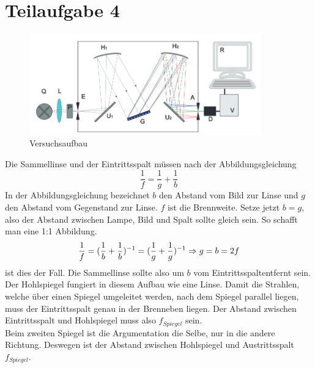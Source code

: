 

\section{Teilaufgabe 4}

\begin{figure}[h]
    \begin{center}
        \includegraphics[width=10cm]{Bilder/SP1.PNG}
    \end{center}
    \caption{Versuchsaufbau}
\end{figure}
Die Sammellinse und der Eintrittsspalt müssen nach der Abbildungsgleichung 
\begin{equation}
    \frac{1}{f}= \frac{1}{g}+\frac{1}{b}   
\end{equation}
In der Abbildungsgleichung bezeichnet $b$ den Abstand vom Bild zur Linse und $g$ den Abstand vom Gegenstand zur Linse. $f$ ist die Brennweite. Setze jetzt $b = g $, also der Abstand zwischen 
Lampe, Bild und Spalt sollte gleich sein. So schafft man eine 1:1 Abbildung. 
\begin{equation}
    \frac{1}{f} = (\frac{1}{b}+\frac{1}{b})^{-1} = (\frac{1}{g}+\frac{1}{g})^{-1}
    \newline
    \Rightarrow g = b = 2f
\end{equation}
ist dies der Fall. Die Sammellinse sollte also um $b$ vom Eintrittsspaltentfernt sein.\\
Der Hohlspiegel fungiert in diesem Aufbau wie eine Linse. Damit die Strahlen, welche über einen Spiegel umgeleitet werden, nach dem Spiegel parallel liegen, muss der Eintrittsspalt genau in der Brenneben liegen. Der Abstand zwischen Eintrittsspalt und Hohlspiegel muss also $f_{Spiegel}$ sein.\\
Beim zweiten Spiegel ist die Argumentation die Selbe, nur in die andere Richtung. Deswegen ist der Abstand zwischen Hohlspiegel und Austrittsspalt $f_{Spiegel}$.